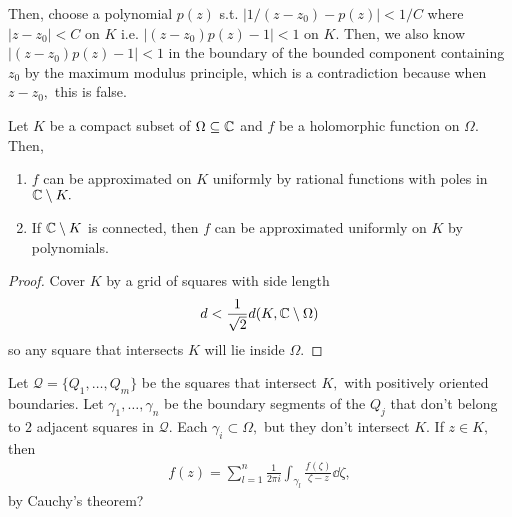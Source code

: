 \documentclass[a4paper,12pt]{article}
\begin{document}
Then, choose a polynomial $p(z)$ s.t. $|1/(z-z_0)-p(z)|<1/C$ where $|z-z_0|<C$ on $K$ i.e. $|(z-z_0)p(z)-1|<1$ on $K.$ Then, we also know $|(z-z_0)p(z)-1|<1$ in the boundary of the bounded component containing $z_0$ by the maximum modulus principle, which is a contradiction because when $z-z_0,$ this is false.
\begin{theorem}
    Let $K$ be a compact subset of $\Omega\subseteq\mathbb{C}$ and $f$ be a holomorphic function on $\Omega.$ Then, \begin{enumerate}
        \item $f$ can be approximated on $K$ uniformly by rational functions with poles in $\mathbb{C}\setminus K.$
        \item If $\mathbb{C}\setminus K$ is connected, then $f$ can be approximated uniformly on $K$ by polynomials.
    \end{enumerate}
    \begin{proof}
        Cover $K$ by a grid of squares with side length \begin{align}
            d<\frac{1}{\sqrt 2}d(K,\mathbb{C}\setminus\Omega)
        \end{align}
        so any square that intersects $K$ will lie inside $\Omega.$
    \end{proof}
    Let $\mathcal Q=\{Q_1,\dots,Q_m\}$ be the squares that intersect $K,$ with positively oriented boundaries. Let $\gamma_1,\ldots,\gamma_n$ be the boundary segments of the $Q_j$ that don't belong to $2$ adjacent squares in $\mathcal Q.$ Each $\gamma_i\subset\Omega,$ but they don't intersect $K.$ If $z\in K,$ then \begin{align}
        f(z)=\sum_{l=1}^n\frac{1}{2\pi i}\int_{\gamma_l}\frac{f(\zeta)}{\zeta-z}\dd\zeta,
    \end{align}
    by Cauchy's theorem?
\end{theorem}
\end{document}
